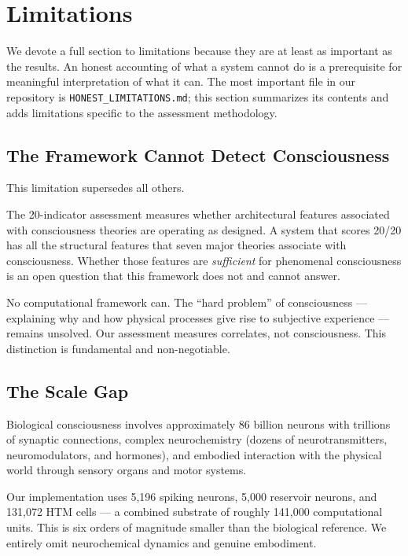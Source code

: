 \section{Limitations}
\label{sec:limitations}

We devote a full section to limitations because they are at least as important as the results. An honest accounting of what a system cannot do is a prerequisite for meaningful interpretation of what it can. The most important file in our repository is \texttt{HONEST\_LIMITATIONS.md}; this section summarizes its contents and adds limitations specific to the assessment methodology.

\subsection{The Framework Cannot Detect Consciousness}

This limitation supersedes all others.

The 20-indicator assessment measures whether architectural features associated with consciousness theories are operating as designed. A system that scores 20/20 has all the structural features that seven major theories associate with consciousness. Whether those features are \textit{sufficient} for phenomenal consciousness is an open question that this framework does not and cannot answer.

No computational framework can. The ``hard problem'' of consciousness \cite{chalmers1995} --- explaining why and how physical processes give rise to subjective experience --- remains unsolved. Our assessment measures correlates, not consciousness. This distinction is fundamental and non-negotiable.

\subsection{The Scale Gap}

Biological consciousness involves approximately 86 billion neurons with trillions of synaptic connections, complex neurochemistry (dozens of neurotransmitters, neuromodulators, and hormones), and embodied interaction with the physical world through sensory organs and motor systems.

Our implementation uses 5,196 spiking neurons, 5,000 reservoir neurons, and 131,072 HTM cells --- a combined substrate of roughly 141,000 computational units. This is six orders of magnitude smaller than the biological reference. We entirely omit neurochemical dynamics and genuine embodiment.

